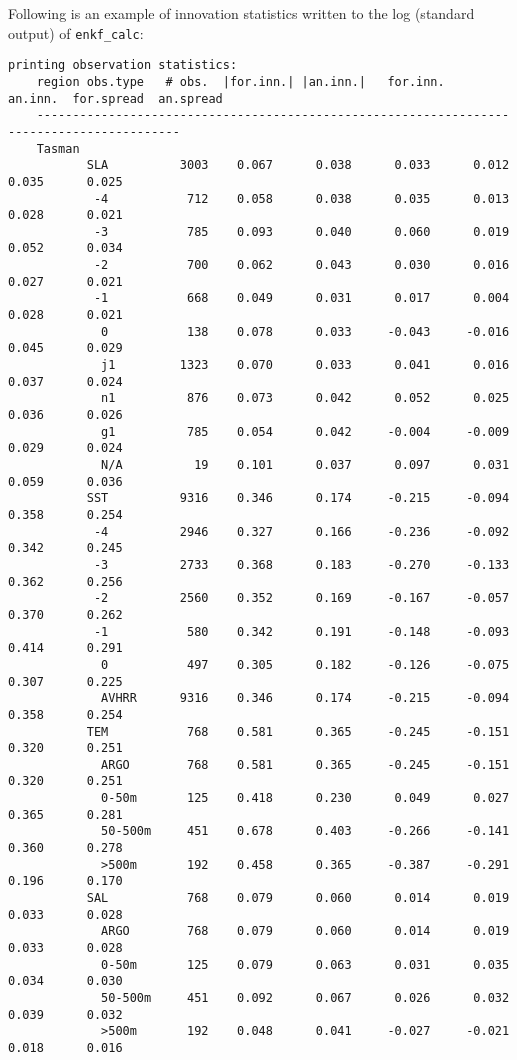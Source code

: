 \documentclass[11pt]{report}
\begin{document}
Following is an example of innovation statistics written to the log (standard output) of \verb|enkf_calc|:
\begin{Verbatim}[frame=single,fontsize=\footnotesize]
  printing observation statistics:
    region obs.type   # obs.  |for.inn.| |an.inn.|   for.inn.   an.inn.  for.spread  an.spread
    ------------------------------------------------------------------------------------------
    Tasman
           SLA          3003    0.067      0.038      0.033      0.012      0.035      0.025  
            -4           712    0.058      0.038      0.035      0.013      0.028      0.021  
            -3           785    0.093      0.040      0.060      0.019      0.052      0.034  
            -2           700    0.062      0.043      0.030      0.016      0.027      0.021  
            -1           668    0.049      0.031      0.017      0.004      0.028      0.021  
             0           138    0.078      0.033     -0.043     -0.016      0.045      0.029  
             j1         1323    0.070      0.033      0.041      0.016      0.037      0.024  
             n1          876    0.073      0.042      0.052      0.025      0.036      0.026  
             g1          785    0.054      0.042     -0.004     -0.009      0.029      0.024  
             N/A          19    0.101      0.037      0.097      0.031      0.059      0.036  
           SST          9316    0.346      0.174     -0.215     -0.094      0.358      0.254  
            -4          2946    0.327      0.166     -0.236     -0.092      0.342      0.245  
            -3          2733    0.368      0.183     -0.270     -0.133      0.362      0.256  
            -2          2560    0.352      0.169     -0.167     -0.057      0.370      0.262  
            -1           580    0.342      0.191     -0.148     -0.093      0.414      0.291  
             0           497    0.305      0.182     -0.126     -0.075      0.307      0.225  
             AVHRR      9316    0.346      0.174     -0.215     -0.094      0.358      0.254  
           TEM           768    0.581      0.365     -0.245     -0.151      0.320      0.251  
             ARGO        768    0.581      0.365     -0.245     -0.151      0.320      0.251  
             0-50m       125    0.418      0.230      0.049      0.027      0.365      0.281  
             50-500m     451    0.678      0.403     -0.266     -0.141      0.360      0.278  
             >500m       192    0.458      0.365     -0.387     -0.291      0.196      0.170  
           SAL           768    0.079      0.060      0.014      0.019      0.033      0.028  
             ARGO        768    0.079      0.060      0.014      0.019      0.033      0.028  
             0-50m       125    0.079      0.063      0.031      0.035      0.034      0.030  
             50-500m     451    0.092      0.067      0.026      0.032      0.039      0.032  
             >500m       192    0.048      0.041     -0.027     -0.021      0.018      0.016  
\end{Verbatim}
\end{document}
